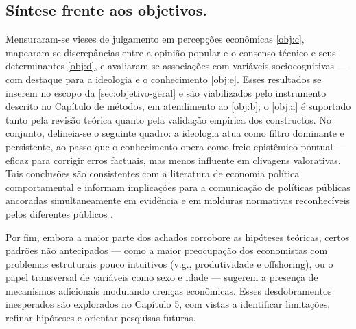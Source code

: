 \subsection{Síntese frente aos objetivos.}
Mensuraram-se vieses de julgamento em percepções econômicas \autoref{obj:c}, mapearam-se discrepâncias entre a opinião popular e o consenso técnico e seus determinantes \autoref{obj:d}, e avaliaram-se associações com variáveis sociocognitivas — com destaque para a ideologia e o conhecimento \autoref{obj:e}. Esses resultados se inserem no escopo da \autoref{sec:objetivo-geral} e são viabilizados pelo instrumento descrito no Capítulo de métodos, em atendimento ao \autoref{obj:b}; o \autoref{obj:a} é suportado tanto pela revisão teórica quanto pela validação empírica dos constructos. No conjunto, delineia-se o seguinte quadro: a ideologia atua como filtro dominante e persistente, ao passo que o conhecimento opera como freio epistêmico pontual — eficaz para corrigir erros factuais, mas menos influente em clivagens valorativas. Tais conclusões são consistentes com a literatura de economia política comportamental e informam implicações para a comunicação de políticas públicas ancoradas simultaneamente em evidência e em molduras normativas reconhecíveis pelos diferentes públicos \cite{kahneman2011thinking, kahan2012polarization, Systematically_Biased_Beliefs_about_Economics}.

Por fim, embora a maior parte dos achados corrobore as hipóteses teóricas, certos padrões não antecipados — como a maior preocupação dos economistas com problemas estruturais pouco intuitivos (v.g., produtividade e offshoring), ou o papel transversal de variáveis como sexo e idade — sugerem a presença de mecanismos adicionais modulando crenças econômicas. Esses desdobramentos inesperados são explorados no Capítulo 5, com vistas a identificar limitações, refinar hipóteses e orientar pesquisas futuras.